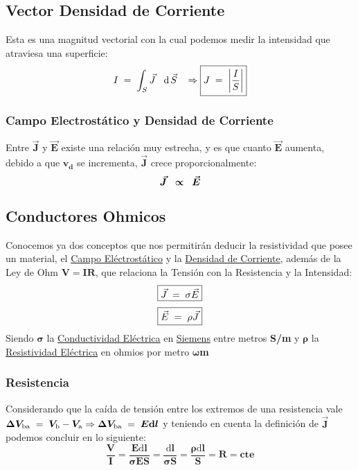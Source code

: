 \subsection{Vector Densidad de Corriente}
\noindent Esta es una magnitud vectorial con la cual podemos medir la intensidad que atraviesa una superficie:
\[
        I \hspace{1mm} = \hspace{1mm} \int_{S} \vec{J}\hspace{3mm}\mathrm{d}\hspace{.5mm}\vec{S}\hspace{3mm}\Rightarrow  \boxed{J\hspace{1mm} = \hspace{1mm} \left | \frac{I}{S} \right |}
\]
\subsubsection{Campo Electrostático y Densidad de Corriente}
\noindent Entre \(\bm{\vec{J}}\) y \(\bm{\vec{E}}\) existe una relación muy estrecha, y es que cuanto \(\bm{\vec{E}}\) aumenta, debido a que \(\bm{v_d}\) se incrementa, \(\bm{\vec{J}}\) crece proporcionalmente:
\[
        \bm{\vec{J}} \hspace{2mm} \bm{\propto} \hspace{2mm} \bm{\vec{E}}
\]
\subsection{Conductores Ohmicos}
\noindent Conocemos ya dos conceptos que nos permitirán deducir la resistividad que posee un material, el \underline{Campo Eléctrostático} y la \underline{Densidad de Corriente}, además de la Ley de Ohm \(\bm{V = IR}\), que relaciona la Tensión con la Resistencia y la Intensidad:
\[
        \boxed{\vec{J} \hspace{1mm} = \hspace{1mm} \sigma \vec{E}}
\]
\[
        \boxed{\vec{E} \hspace{1mm} = \hspace{1mm} \rho \vec{J}}
\]
Siendo \(\bm{\sigma}\) la \underline{Conductividad Eléctrica} en \underline{Siemens} entre metros \textbf{S/m} y \(\bm{\rho}\) la \underline{Resistividad Eléctrica} en ohmios por metro \(\bm{\omega}\)\textbf{m}
\subsubsection{Resistencia}
\noindent Considerando que la caída de tensión entre los extremos de una resistencia vale \\ \(\bm{\Delta V_{\textnormal{ba}}} \hspace{1mm}= \hspace{1mm} \bm{V_\textnormal{b}} -\bm{V_\textnormal{a}}  \Rightarrow \bm{\Delta V_{\textnormal{ba}}}\hspace{1mm}= \hspace{1mm} \bm{E \mathrm{d}l}\) y teniendo en cuenta la definición de \(\bm{\vec{J}}\) podemos concluir en lo siguiente:
\[
        \boxed{\bm{\frac{V}{I} = \frac{E\mathrm{d}l}{\sigma E S} = \frac{\mathrm{d}l}{\sigma S} = \frac{\rho \mathrm{d}l}{S} = R = cte}}
\]
